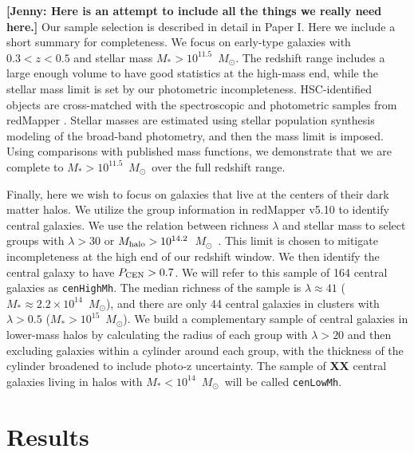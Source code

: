 \documentclass[a4paper,fleqn,usenatbib]{mnras}
\def\msun{$M_\odot$}
\def\rbcg{\texttt{cenHighMh}}
\def\nbcg{\texttt{cenLowMh}}
\newcommand{\jenny}[1]{\textcolor{Bittersweet}{\textbf{[Jenny: #1]}}}
\begin{document}
    \jenny{Here is an attempt to include all the things we really need here.}
    Our sample selection is described in detail in Paper I. Here we include a short summary for completeness. 
    We focus on early-type galaxies with $0.3<z<0.5$ and stellar mass $M_*>10^{11.5}$~\msun. 
    The redshift range includes a large enough volume to have good statistics at the high-mass end, while 
    the stellar mass limit is set by our photometric incompleteness. HSC-identified objects are cross-matched 
    with the spectroscopic and photometric samples from redMapper \citep{Rykoff2014}. Stellar masses are estimated 
    using stellar population synthesis modeling of the broad-band photometry, and then the mass limit is 
    imposed. Using comparisons with published mass functions, we demonstrate that we are complete 
    to $M_*>10^{11.5}$~\msun\ over the full redshift range. 
    
    Finally, here we wish to focus on galaxies that live at the centers of their dark matter halos. 
    We utilize the group information 
    in redMapper v5.10 \citep{Rykoff2014,Rozo2015b} to identify central galaxies. We use the 
    relation between richness $\lambda$ and stellar mass to select groups with 
    $\lambda>30$ or $M_{\rm halo}>10^{14.2}$~\msun\ \citep[e.g.,][]{simetetal2016}. This limit is chosen 
    to mitigate incompleteness at the high end of our redshift window. We then identify the 
    central galaxy to have $P_{\rm CEN}>0.7$. We will refer to this sample of 164 central galaxies as \rbcg{}. The median 
    richness of the sample is $\lambda \approx 41$ ($M_* \approx 2.2 \times 10^{14}$~\msun), and there are 
    only 44 central galaxies in clusters with $\lambda>0.5$ ($M_* > 10^{15}$~\msun). We build a complementary 
    sample of central galaxies in lower-mass halos by calculating the radius of each group with 
    $\lambda>20$ \citep{Diemer2015} and 
    then excluding galaxies within a cylinder around each group, with the thickness of the cylinder broadened to include 
    photo-z uncertainty. The sample of {\bf XX} central galaxies living in halos with $M_* < 10^{14}$~\msun\ will 
    be called \nbcg{}.

    

\section{Results}
    \label{sec:results}
\end{document}
